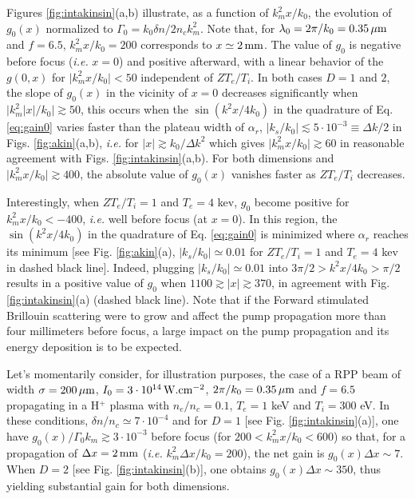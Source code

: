 \documentclass[
 reprint,
 amsmath,amssymb,
 aps,
]{revtex4-1}
\begin{document}
Figures \ref{fig:intakinsin}(a,b) illustrate, as a function of $k_m^2 x /k_0$, the evolution of $g_0(x)$
normalized to $\Gamma_0=k_0\delta n / 2n_ck_m^2$. Note that, for $\lambda_0=2\pi/k_0=0.35\,\rm\mu m$ and $f=6.5$,  $k_m^2 x /k_0=200$ corresponds to $x\simeq 2\,\rm mm$. 
The value of $g_0$ is negative before focus (\emph{i.e.} $x=0$) and positive afterward, with  a linear behavior of the $g(0,x)$ for  $\vert k_m^2 x /k_0 \vert < 50$  independent of $ZT_e/T_i$. In both cases $D=1$ and $2$, the slope of $g_0(x)$  in the vicinity of $x=0$   decreases significantly when   $\vert k_m^2 \vert x\vert /k_0 \vert \gtrsim 50$, this occurs when the $\sin(k^2x/4k_0)$ in the quadrature of Eq. \eqref{eq:gain0} varies faster than the plateau width of $\alpha_r$, $\vert k_s/k_0\vert \lesssim 5\cdot 10^{-3}\equiv \Delta k/2$ in Figs. \ref{fig:akin}(a,b), \emph{i.e.} for $\vert x\vert \gtrsim k_0/\Delta k^2$ which gives $\vert k_m^2x/k_0 \vert  \gtrsim 60  $ in reasonable  agreement with Figs. \ref{fig:intakinsin}(a,b).
For both dimensions and $\vert k_m^2 x /k_0 \vert \gtrsim 400$, the absolute value of $g_0(x)$ vanishes faster as $ZT_e/T_i$ decreases. 

Interestingly, when $ZT_e/T_i=1$ and $T_e=4$ kev, $g_0$ become positive for $k_m^2x/k_0<-400$, \emph{i.e.} well before focus (at $x=0$). In this region,  the $\sin(k^2x/4k_0)$ in the quadrature of Eq. \eqref{eq:gain0} is minimized   where $\alpha_r$ reaches its minimum [see Fig. \ref{fig:akin}(a), $\vert k_s/k_0\vert \simeq 0.01$ for $ZT_e/T_i=1$ and $T_e=4$ kev in dashed black line]. Indeed, plugging  $\vert k_s/k_0\vert \simeq 0.01$ into $3\pi/2>k^2x/4k_0>\pi/2$ results in a positive value of $g_0$  when $1100\gtrsim \vert x\vert\gtrsim 370$, in agreement with Fig. \ref{fig:intakinsin}(a) (dashed black line).
Note that if the Forward stimulated Brillouin  scattering were to grow   and affect the pump propagation more than four millimeters before focus, a large impact on the pump propagation and its energy deposition is to be expected.

Let's momentarily consider, for illustration purposes,  the  case of a RPP beam of width $\sigma =200\,\rm\mu m$, $I_0=3\cdot 10^{14} \,\rm W.cm^{-2}$, $2\pi/k_0 = 0.35\,\rm\mu m$ and $f = 6.5$ propagating in a H$^{+}$ plasma with $n_e/n_c=0.1$,  $T_e=1$ keV and $T_i=300$ eV. In these conditions, $\delta n/n_c \simeq 7\cdot 10^{-4}$ and  for $D=1$ [see Fig. \ref{fig:intakinsin}(a)], one have $g_0(x)/\Gamma_0k_m \gtrsim 3\cdot 10^{-3}$ before focus (for $200< k_m^2 x/k_0 < 600$) so that, for  a propagation of $\Delta x = 2\,\rm mm$ (\emph{i.e.} $k_m^2 \Delta x/k_0 = 200$), the net gain is $g_0(x)\Delta x\sim 7 $. When $D=2$ [see Fig. \ref{fig:intakinsin}(b)], one obtains $g_0(x)\Delta x\sim 350 $, thus yielding substantial gain for both dimensions.
\end{document}
